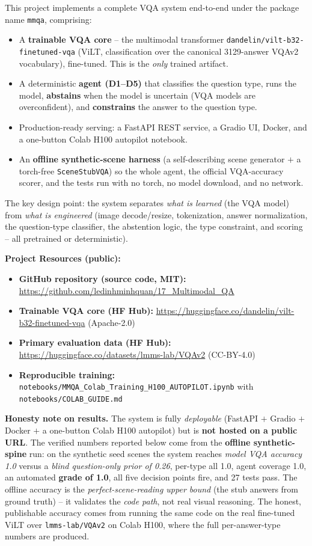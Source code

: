 \documentclass[12pt,a4paper]{article}
\begin{document}
This project implements a complete VQA system end-to-end under the package name \texttt{mmqa}, comprising:
\begin{itemize}
  \item A \textbf{trainable VQA core} -- the multimodal transformer \texttt{dandelin/vilt-b32-finetuned-vqa} (ViLT, classification over the canonical 3129-answer VQAv2 vocabulary), fine-tuned. This is the \emph{only} trained artifact.
  \item A deterministic \textbf{agent (D1--D5)} that classifies the question type, runs the model, \textbf{abstains} when the model is uncertain (VQA models are overconfident), and \textbf{constrains} the answer to the question type.
  \item Production-ready serving: a FastAPI REST service, a Gradio UI, Docker, and a one-button Colab H100 autopilot notebook.
  \item An \textbf{offline synthetic-scene harness} (a self-describing scene generator $+$ a torch-free \texttt{SceneStubVQA}) so the whole agent, the official VQA-accuracy scorer, and the tests run with no torch, no model download, and no network.
\end{itemize}

The key design point: the system separates \emph{what is learned} (the VQA model) from \emph{what is engineered} (image decode/resize, tokenization, answer normalization, the question-type classifier, the abstention logic, the type constraint, and scoring -- all pretrained or deterministic).

\textbf{Project Resources (public):}
\begin{itemize}\setlength\itemsep{0.15em}
  \item \textbf{GitHub repository (source code, MIT):} \url{https://github.com/ledinhminhquan/17_Multimodal_QA}
  \item \textbf{Trainable VQA core (HF Hub):} \url{https://huggingface.co/dandelin/vilt-b32-finetuned-vqa} (Apache-2.0)
  \item \textbf{Primary evaluation data (HF Hub):} \url{https://huggingface.co/datasets/lmms-lab/VQAv2} (CC-BY-4.0)
  \item \textbf{Reproducible training:} \texttt{notebooks/MMQA\_Colab\_Training\_H100\_AUTOPILOT.ipynb} with \texttt{notebooks/COLAB\_GUIDE.md}
\end{itemize}

\textbf{Honesty note on results.} The system is fully \emph{deployable} (FastAPI $+$ Gradio $+$ Docker $+$ a one-button Colab H100 autopilot) but is \textbf{not hosted on a public URL}. The verified numbers reported below come from the \textbf{offline synthetic-spine} run: on the synthetic seed scenes the system reaches \emph{model VQA accuracy 1.0} versus a \emph{blind question-only prior of 0.26}, per-type all 1.0, agent coverage 1.0, an automated \textbf{grade of 1.0}, all five decision points fire, and 27 tests pass. The offline accuracy is the \emph{perfect-scene-reading upper bound} (the stub answers from ground truth) -- it validates the \emph{code path}, not real visual reasoning. The honest, publishable accuracy comes from running the same code on the real fine-tuned ViLT over \texttt{lmms-lab/VQAv2} on Colab H100, where the full per-answer-type numbers are produced.
\end{document}
